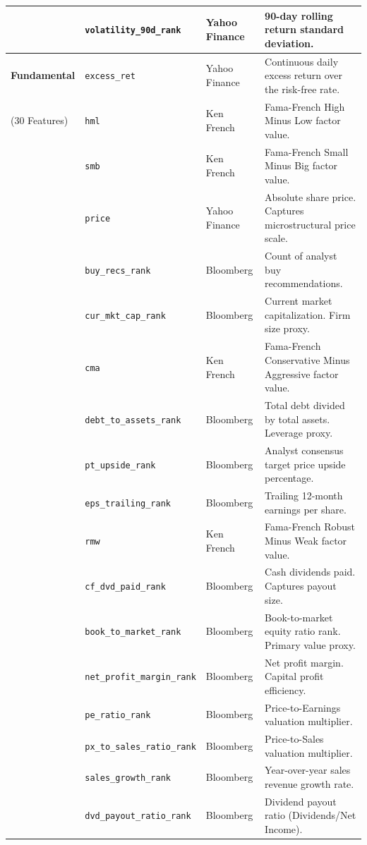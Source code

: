 \documentclass[11pt]{article}
\begin{document}
\begin{longtable}{p{3.0cm} p{4.5cm} p{2.2cm} p{6.0cm}}
    & \texttt{volatility\_90d\_rank} & Yahoo Finance & 90-day rolling return standard deviation. \\
    \midrule
    \textbf{Fundamental} & \texttt{excess\_ret} & Yahoo Finance & Continuous daily excess return over the risk-free rate. \\
    (30 Features) & \texttt{hml} & Ken French & Fama-French High Minus Low factor value. \\
    & \texttt{smb} & Ken French & Fama-French Small Minus Big factor value. \\
    & \texttt{price} & Yahoo Finance & Absolute share price. Captures microstructural price scale. \\
    & \texttt{buy\_recs\_rank} & Bloomberg & Count of analyst buy recommendations. \\
    & \texttt{cur\_mkt\_cap\_rank} & Bloomberg & Current market capitalization. Firm size proxy. \\
    & \texttt{cma} & Ken French & Fama-French Conservative Minus Aggressive factor value. \\
    & \texttt{debt\_to\_assets\_rank} & Bloomberg & Total debt divided by total assets. Leverage proxy. \\
    & \texttt{pt\_upside\_rank} & Bloomberg & Analyst consensus target price upside percentage. \\
    & \texttt{eps\_trailing\_rank} & Bloomberg & Trailing 12-month earnings per share. \\
    & \texttt{rmw} & Ken French & Fama-French Robust Minus Weak factor value. \\
    & \texttt{cf\_dvd\_paid\_rank} & Bloomberg & Cash dividends paid. Captures payout size. \\
    & \texttt{book\_to\_market\_rank} & Bloomberg & Book-to-market equity ratio rank. Primary value proxy. \\
    & \texttt{net\_profit\_margin\_rank} & Bloomberg & Net profit margin. Capital profit efficiency. \\
    & \texttt{pe\_ratio\_rank} & Bloomberg & Price-to-Earnings valuation multiplier. \\
    & \texttt{px\_to\_sales\_ratio\_rank} & Bloomberg & Price-to-Sales valuation multiplier. \\
    & \texttt{sales\_growth\_rank} & Bloomberg & Year-over-year sales revenue growth rate. \\
    & \texttt{dvd\_payout\_ratio\_rank} & Bloomberg & Dividend payout ratio (Dividends/Net Income). \\

\end{longtable}
\end{document}

